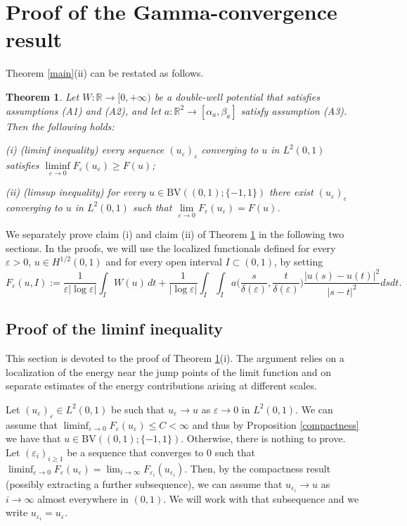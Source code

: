\documentclass[12pt]{article}
\newtheorem{theorem}[definition]{Theorem}
\newcommand{\R}{\mathbb{R}}
\newcommand{\BV}{\mathrm{BV}}
\numberwithin{equation}{section}
\def\R{\mathbb R}
\begin{document}
\section{Proof of the Gamma-convergence result}


Theorem \ref{main}(ii) can be restated as follows.


\begin{theorem}\label{sub-main}
Let $W:\R\to[0,+\infty)$ be a double-well potential that satisfies assumptions {\rm (A1)} and {\rm (A2)}, and let $a:\R^2\to[\alpha_{a},\beta_{a}]$ satisfy assumption {\rm (A3)}. Then the following holds: 

\smallskip
{\rm(i) (liminf inequality)} every sequence $(u_{\varepsilon})_{\varepsilon}$ converging to $u$ in $L^2(0,1)$ satisfies 
$\liminf\limits_{\varepsilon\to0}F_{\varepsilon}(u_{\varepsilon})\geq F(u)$;


\smallskip
{\rm(ii) (limsup inequality)} for every $u\in\BV\left((0,1);\{-1,1\}\right)$ there exist $(u_{\varepsilon})_{\varepsilon}$ converging to $u$ in $L^2(0,1)$ such that 
 $\lim\limits_{\varepsilon\to 0}F_{\varepsilon}(u_{\varepsilon})=F(u)$.
\end{theorem} 

We separately prove claim (i) and claim (ii) of Theorem \ref{sub-main} in the following two sections.
In the proofs, we will use the localized functionals defined for every $\varepsilon > 0$, 
$u \in H^{1/2}(0,1)$ and for every open interval $I \subset (0,1)$, by setting
\begin{equation*}
F_{\varepsilon}(u,I) :=
\frac{1}{\varepsilon\left|\log\varepsilon\right|}\int_{I} W(u)\,dt+\frac{1}{\left|\log\varepsilon\right|}
\int_{I}\int_{I}a\Big(\frac{s}{\delta(\varepsilon)},\frac{t}{\delta(\varepsilon)}
    \Big)
\frac{\left|u(s)-u(t)\right|^2}{\left|s-t\right|^2}
dsdt.
\end{equation*}


\subsection{Proof of the liminf inequality}
This section is devoted to the proof of Theorem \ref{sub-main}(i). The argument relies on a localization of the energy near the jump points of the limit function and on separate estimates of the energy contributions arising at different scales.


\bigskip
Let $(u_{\varepsilon})_{\varepsilon}\in L^2(0,1)$ be such that $u_{\varepsilon}\to u$ as $\varepsilon\to 0$ in $L^2(0,1)$. 
We can assume that $\liminf_{\varepsilon\to0}F_{\varepsilon}(u_{\varepsilon})\le C<\infty$ and thus by Proposition \ref{compactness} we have that $u\in\BV((0,1);\{-1,1\})$. Otherwise, there is nothing to prove. Let $(\varepsilon_{i})_{i\ge1}$ be a sequence that converges to $0$ such that  
$\liminf_{\varepsilon\to0}F_{\varepsilon}(u_{\varepsilon})=\lim_{i\to\infty}F_{\varepsilon_{i}}(u_{\varepsilon_{i}})$. 
 Then, by the compactness result (possibly extracting a further subsequence), we can assume that $u_{\varepsilon_{i}}\to u$ as $i\to\infty$ almost everywhere in $(0,1)$.
 We will work with that subsequence and we write $u_{\varepsilon_{i}}=u_{\varepsilon}$. 
 
\end{document}
